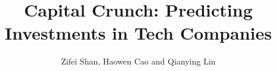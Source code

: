 \documentclass{sig-alternate}
\begin{document}
\title{Capital Crunch: Predicting Investments in Tech Companies}

\author{
\alignauthor
Zifei Shan, Haowen Cao and Qianying Lin\\
        \\
}

\maketitle









\end{document}
